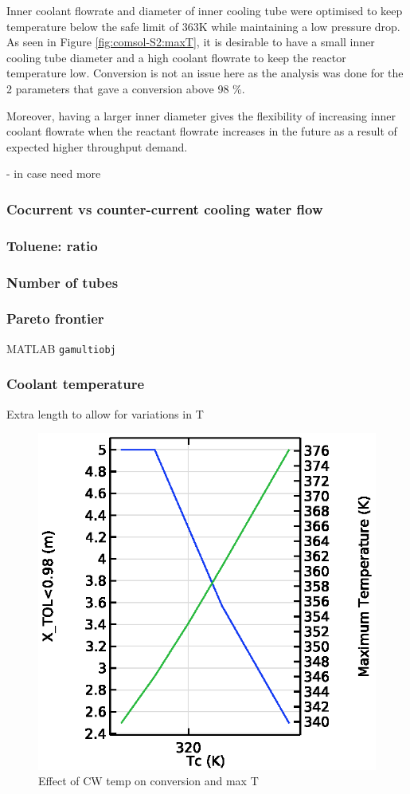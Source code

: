Inner coolant flowrate and diameter of inner cooling tube were optimised to keep temperature below the safe limit of 363K while maintaining a low pressure drop. As seen in Figure \ref{fig:comsol-S2:maxT}, it is desirable to have a small inner cooling tube diameter and a high coolant flowrate to keep the reactor temperature low. Conversion is not an issue here as the analysis was done for the 2 parameters that gave a conversion above 98 \%.

Moreover, having a larger inner diameter gives the flexibility of increasing inner coolant flowrate when the reactant flowrate increases in the future as a result of expected higher throughput demand. 

- in case need more


\subsubsection{Cocurrent vs counter-current cooling water flow}

\subsubsection{Toluene:  ratio}

\subsubsection{Number of tubes}

\subsubsection{Pareto frontier}
MATLAB \texttt{gamultiobj}

\subsubsection{Coolant temperature}
Extra length to allow for variations in T

\begin{figure}[h]
    \centering
    \includegraphics[width=0.49\linewidth]{figures/S4-CW-X-T.eps}
    \caption{Effect of CW temp on conversion and max T}
    \label{fig:comsol-S4-CW-X-T}
\end{figure}
